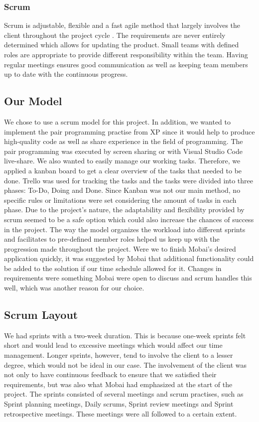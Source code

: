 \subsubsection*{Scrum}
Scrum is adjustable, flexible and a fast agile method that largely involves the client throughout the project cycle \cite{ScrumDefinition}. The requirements are never entirely determined which allows for updating the product. Small teams with defined roles are appropriate to provide different responsibility within the team. Having regular meetings ensures good communication as well as keeping team members up to date with the continuous progress.    

\subsection{Our Model}
\label{sec:OurModel}
We chose to use a scrum model for this project. In addition, we wanted to implement the pair programming practise from XP since it would help to produce high-quality code as well as share experience in the field of programming. The pair programming was executed by screen sharing or with Visual Studio Code live-share. We also wanted to easily manage our working tasks. Therefore, we applied a kanban board to get a clear overview of the tasks that needed to be done. Trello \cite{Trello} was used for tracking the tasks and the tasks were divided into three phases: To-Do, Doing and Done. Since Kanban was not our main method, no specific rules or limitations were set considering the amount of tasks in each phase. Due to the project's nature, the adaptability and flexibility provided by scrum seemed to be a safe option which could also increase the chances of success in the project. The way the model organizes the workload into different sprints and facilitates to pre-defined member roles helped us keep up with the progression made throughout the project. Were we to finish Mobai's desired application quickly, it was suggested by Mobai that additional functionality could be added to the solution if our time schedule allowed for it. Changes in requirements were something Mobai were open to discuss and scrum handles this well, which was another reason for our choice. 

\subsection{Scrum Layout}
We had sprints with a two-week duration. This is because one-week sprints felt short and would lead to excessive meetings which would affect our time management. Longer sprints, however, tend to involve the client to a lesser degree, which would not be ideal in our case. The involvement of the client was not only to have continuous feedback to ensure that we satisfied their requirements, but was also what Mobai had emphasized at the start of the project. The sprints consisted of several meetings and scrum practises, such as Sprint planning meetings, Daily scrums, Sprint review meetings and Sprint retrospective meetings. These meetings were all followed to a certain extent. 


